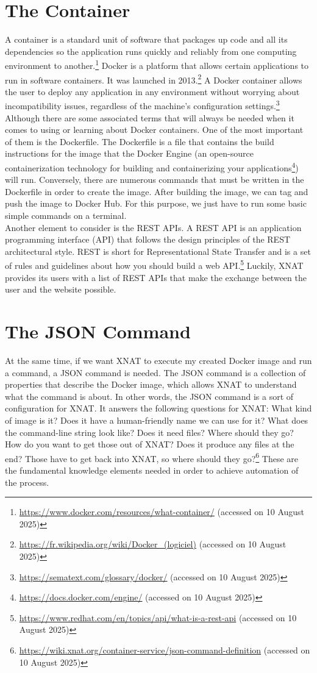 \section{The Container}
A container is a standard unit of software that packages up code and all its dependencies so the application runs quickly and reliably from one computing environment to another.\footnote{\url{https://www.docker.com/resources/what-container/} (accessed on 10 August 2025)}
Docker is a platform that allows certain applications to run in software containers. It was launched in 2013.\footnote{\url{https://fr.wikipedia.org/wiki/Docker\_(logiciel)} (accessed on 10 August 2025)} A Docker container allows the user to deploy any application in any environment without worrying about incompatibility issues, regardless of the machine’s configuration settings.\footnote{\url{https://sematext.com/glossary/docker/} (accessed on 10 August 2025)} Although there are some associated terms that will always be needed when it comes to using or learning about Docker containers.
One of the most important of them is the Dockerfile. The Dockerfile is a file that contains the build instructions for the image that the Docker Engine (an open-source containerization technology for building and containerizing your applications\footnote{\url{https://docs.docker.com/engine/} (accessed on 10 August 2025)}) will run. Conversely, there are numerous commands that must be written in the Dockerfile in order to create the image. After building the image, we can tag and push the image to Docker Hub. For this purpose, we just have to run some basic simple commands on a terminal.
\\
Another element to consider is the REST APIs. A REST API is an application programming interface (API) that follows the design principles of the REST architectural style. REST is short for Representational State Transfer and is a set of rules and guidelines about how you should build a web API.\footnote{\url{https://www.redhat.com/en/topics/api/what-is-a-rest-api} (accessed on 10 August 2025)} Luckily, XNAT provides its users with a list of REST APIs that make the exchange between the user and the website possible. 

\section{The JSON Command}
At the same time, if we want XNAT to execute my created Docker image and run a command, a \ac{JSON} command is needed. The JSON command is a collection of properties that describe the Docker image, which allows XNAT to understand what the command is about. In other words, the JSON command is a sort of configuration for XNAT. It answers the following questions for XNAT: What kind of image is it? Does it have a human-friendly name we can use for it? What does the command-line string look like? Does it need files? Where should they go? How do you want to get those out of XNAT? Does it produce any files at the end? Those have to get back into XNAT, so where should they go?\footnote{\url{https://wiki.xnat.org/container-service/json-command-definition} (accessed on 10 August 2025)} These are the fundamental knowledge elements needed in order to achieve automation of the process.

